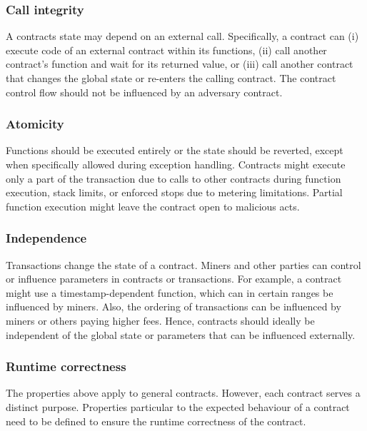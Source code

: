 \subsubsection{Call integrity}
A contracts state may depend on an external call. Specifically, a contract can (i) execute code of an external contract within its functions, (ii) call another contract's function and wait for its returned value, or (iii) call another contract that changes the global state or re-enters the calling contract.
The contract control flow should not be influenced by an adversary contract.

\subsubsection{Atomicity}
Functions should be executed entirely or the state should be reverted, except when specifically allowed during exception handling.
Contracts might execute only a part of the transaction due to calls to other contracts during function execution, stack limits, or enforced stops due to metering limitations.
Partial function execution might leave the contract open to malicious acts.

\subsubsection{Independence}
Transactions change the state of a contract. Miners and other parties can control or influence parameters in contracts or transactions. For example, a contract might use a timestamp-dependent function, which can in certain ranges be influenced by miners. Also, the ordering of transactions can be influenced by miners or others paying higher fees. Hence, contracts should ideally be independent of the global state or parameters that can be influenced externally.

\subsubsection{Runtime correctness}
The properties above apply to general contracts. However, each contract serves a distinct purpose. Properties particular to the expected behaviour of a contract need to be defined to ensure the runtime correctness of the contract.

%

